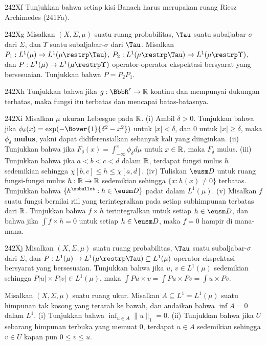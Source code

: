 {\spheader 242Xf Tunjukkan bahwa setiap kisi Banach harus merupakan
ruang Riesz Archimedes (241Fa).

\spheader 242Xg Misalkan $(X,\Sigma,\mu)$ suatu ruang probabilitas,
$\Tau$ suatu subaljabar-$\sigma$ dari $\Sigma$, dan $\Upsilon$ suatu
subaljabar-$\sigma$ dari $\Tau$. Misalkan
$P_1:L^1(\mu)\to L^1(\mu\restrp\Tau)$,
$P_2:L^1(\mu\restrp\Tau)\to L^1(\mu\restrp\Upsilon)$, dan
$P:L^1(\mu)\to L^1(\mu\restrp\Upsilon)$ operator-operator ekspektasi
bersyarat yang bersesuaian. Tunjukkan bahwa $P=P_2P_1$.

\spheader 242Xh Tunjukkan bahwa jika $g:\BbbR^r\to\Bbb R$ kontinu dan
mempunyai dukungan terbatas, maka fungsi itu terbatas dan mencapai batas-batasnya.

\spheader 242Xi Misalkan $\mu$ ukuran Lebesgue pada $\Bbb R$. (i) Ambil
$\delta>0$. Tunjukkan bahwa jika
$\phi_{\delta}(x)=\exp(-\Bover{1}{\delta^2-x^2})$ untuk
$|x|<\delta$, dan $0$ untuk $|x|\ge\delta$, maka $\phi_{\delta}$ {\bf mulus},
yakni dapat didiferensialkan sebanyak kali yang diinginkan. (ii) Tunjukkan
bahwa jika $F_{\delta}(x)=\int_{-\infty}^x\phi_{\delta}d\mu$ untuk
$x\in\Bbb R$, maka $F_{\delta}$ mulus. (iii) Tunjukkan bahwa jika
$a<b<c<d$ dalam $\Bbb R$, terdapat fungsi mulus $h$ sedemikian sehingga
$\chi[b,c]\le h\le\chi[a,d]$. (iv) Tuliskan $\eusm D$ untuk ruang
fungsi-fungsi mulus $h:\Bbb R\to\Bbb R$ sedemikian sehingga
$\{x:h(x)\ne 0\}$ terbatas. Tunjukkan bahwa
$\{h^{\ssbullet}:h\in\eusm D\}$ padat dalam $L^1(\mu)$.
(v) Misalkan $f$ suatu fungsi bernilai riil yang terintegralkan pada setiap
subhimpunan terbatas dari $\Bbb R$. Tunjukkan bahwa $f\times h$
terintegralkan untuk setiap $h\in\eusm D$, dan bahwa jika
$\int f\times h=0$ untuk setiap $h\in\eusm D$, maka $f=0$ hampir di
mana-mana. 

\spheader 242Xj Misalkan $(X,\Sigma,\mu)$ suatu ruang probabilitas,
$\Tau$ suatu subaljabar-$\sigma$ dari $\Sigma$, dan
$P:L^1(\mu)\to L^1(\mu\restrp\Tau)\subseteq L^1(\mu)$ operator
ekspektasi bersyarat yang bersesuaian. Tunjukkan bahwa jika $u$,
$v\in L^1(\mu)$ sedemikian sehingga $P|u|\times P|v|\in L^1(\mu)$,
maka $\int Pu\times v=\int Pu\times Pv=\int u\times Pv$.

Misalkan $(X,\Sigma,\mu)$ suatu ruang ukur. Misalkan
$A\subseteq L^1=L^1(\mu)$ suatu himpunan tak kosong yang terarah ke bawah,
dan andaikan bahwa $\inf A=0$ dalam $L^1$. (i) Tunjukkan bahwa
$\inf_{u\in A}\|u\|_1=0$.
 (ii) Tunjukkan bahwa jika $U$ sebarang
himpunan terbuka yang memuat $0$, terdapat $u\in A$ sedemikian sehingga
$v\in U$ kapan pun $0\le v\le u$.

}
